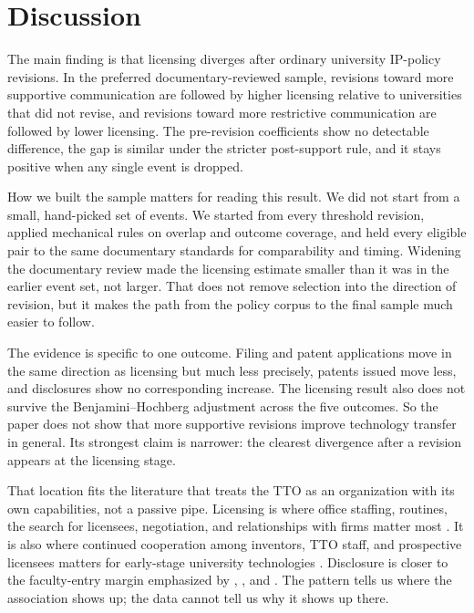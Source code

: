 \section{Discussion}\label{sec:discussion}

The main finding is that licensing diverges after ordinary university IP-policy revisions. In the preferred documentary-reviewed sample, revisions toward more supportive communication are followed by higher licensing relative to universities that did not revise, and revisions toward more restrictive communication are followed by lower licensing. The pre-revision coefficients show no detectable difference, the gap is similar under the stricter post-support rule, and it stays positive when any single event is dropped.

How we built the sample matters for reading this result. We did not start from a small, hand-picked set of events. We started from every threshold revision, applied mechanical rules on overlap and outcome coverage, and held every eligible pair to the same documentary standards for comparability and timing. Widening the documentary review made the licensing estimate smaller than it was in the earlier event set, not larger. That does not remove selection into the direction of revision, but it makes the path from the policy corpus to the final sample much easier to follow.

The evidence is specific to one outcome. Filing and patent applications move in the same direction as licensing but much less precisely, patents issued move less, and disclosures show no corresponding increase. The licensing result also does not survive the Benjamini--Hochberg adjustment across the five outcomes. So the paper does not show that more supportive revisions improve technology transfer in general. Its strongest claim is narrower: the clearest divergence after a revision appears at the licensing stage.

That location fits the literature that treats the TTO as an organization with its own capabilities, not a passive pipe. Licensing is where office staffing, routines, the search for licensees, negotiation, and relationships with firms matter most \citep{SiegelWaldmanLink2003,ThursbyKemp2002,MarkmanEtAl2005}. It is also where continued cooperation among inventors, TTO staff, and prospective licensees matters for early-stage university technologies \citep{JensenThursby2001}. Disclosure is closer to the faculty-entry margin emphasized by \citet{JensenThursbyThursby2003}, \citet{OwenSmithPowell2001}, and \citet{BercovitzFeldman2008}. The pattern tells us where the association shows up; the data cannot tell us why it shows up there.

